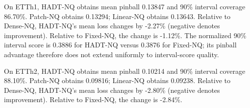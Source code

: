 On ETTh1, HADT-NQ obtains mean pinball 0.13847 and 90\% interval coverage 86.70\%. Patch-NQ obtains 0.13294; Linear-NQ obtains 0.13643. Relative to Dense-NQ, HADT-NQ's mean loss changes by -2.27\% (negative denotes improvement). Relative to Fixed-NQ, the change is -1.12\%. The normalized 90\% interval score is 0.3886 for HADT-NQ versus 0.3876 for Fixed-NQ; its pinball advantage therefore does not extend uniformly to interval-score quality.


On ETTh2, HADT-NQ obtains mean pinball 0.10214 and 90\% interval coverage 88.10\%. Patch-NQ obtains 0.09816; Linear-NQ obtains 0.09238. Relative to Dense-NQ, HADT-NQ's mean loss changes by -2.80\% (negative denotes improvement). Relative to Fixed-NQ, the change is -2.84\%.

